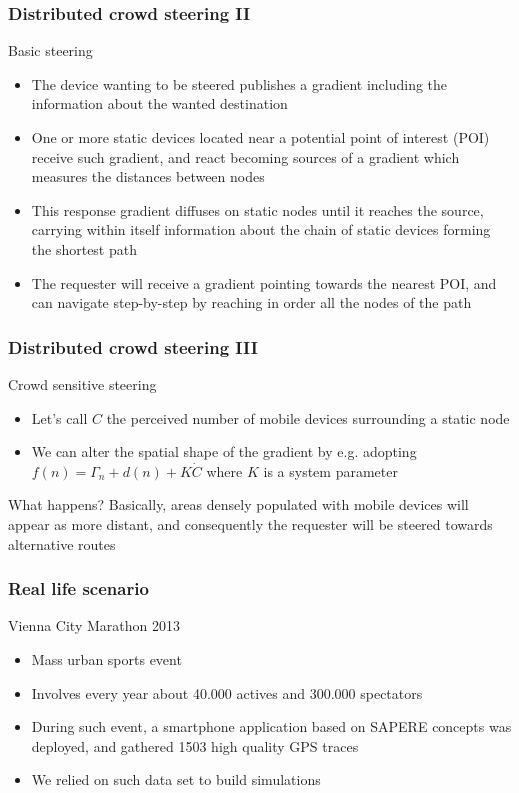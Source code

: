 \documentclass[presentation]{beamer}
\begin{document}
\begin{frame}\frametitle{Distributed crowd steering II}
  \begin{block}{Basic steering}
    \begin{itemize}
     \item The device wanting to be steered publishes a gradient including the information about the wanted destination
     \item One or more static devices located near a potential point of interest (POI) receive such gradient, and react becoming sources of a gradient which measures the distances between nodes
     \item This response gradient diffuses on static nodes until it reaches the source, carrying within itself information about the chain of static devices forming the shortest path
     \item The requester will receive a gradient pointing towards the nearest POI, and can navigate step-by-step by reaching in order all the nodes of the path
    \end{itemize}
  \end{block}
\end{frame}

\begin{frame}\frametitle{Distributed crowd steering III}
  \begin{block}{Crowd sensitive steering}
    \begin{itemize}
     \item Let's call $C$ the perceived number of mobile devices surrounding a static node
     \item We can alter the spatial shape of the gradient by e.g. adopting $f(n) = \varGamma_{n} +d(n) + K\dot C$ where $K$ is a system parameter
    \end{itemize}
  \end{block}
  What happens? Basically, areas densely populated with mobile devices will appear as more distant, and consequently the requester will be steered towards alternative routes
\end{frame}

\begin{frame}\frametitle{Real life scenario}
  \begin{block}{Vienna City Marathon 2013}
    \begin{itemize}
     \item Mass urban sports event
     \item Involves every year about 40.000 actives and 300.000 spectators
     \item During such event, a smartphone application based on SAPERE \cite{sapere-procedia7} concepts was deployed, and gathered 1503 high quality GPS traces \cite{socinfo2013}
     \item We relied on such data set to build simulations
    \end{itemize}
  \end{block}
\end{frame}
\end{document}
